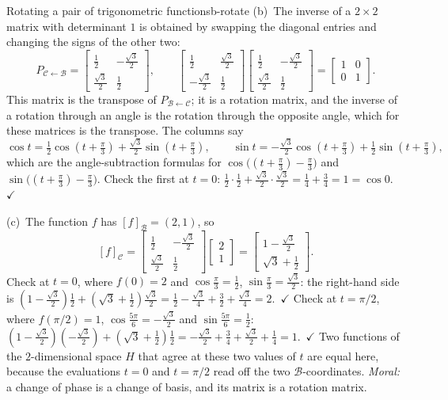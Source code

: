 \documentclass[11pt]{article}
\begin{document}
\begin{exmp}{Rotating a pair of trigonometric functions}{b-rotate}
(b)~The inverse of a $2\times2$ matrix with determinant $1$ is obtained by swapping the diagonal entries and changing the signs of the other two:
\[
P_{\mathcal{C}\leftarrow\mathcal{B}}=\begin{bmatrix}\tfrac12&-\tfrac{\sqrt3}{2}\\\tfrac{\sqrt3}{2}&\tfrac12\end{bmatrix},\qquad \begin{bmatrix}\tfrac12&\tfrac{\sqrt3}{2}\\-\tfrac{\sqrt3}{2}&\tfrac12\end{bmatrix}\begin{bmatrix}\tfrac12&-\tfrac{\sqrt3}{2}\\\tfrac{\sqrt3}{2}&\tfrac12\end{bmatrix}=\begin{bmatrix}1&0\\0&1\end{bmatrix}.
\]
This matrix is the transpose of $P_{\mathcal{B}\leftarrow\mathcal{C}}$; it is a rotation matrix, and the inverse of a rotation through an angle is the rotation through the opposite angle, which for these matrices is the transpose. The columns say
\[
\cos t=\tfrac12\cos(t+\tfrac\pi3)+\tfrac{\sqrt3}{2}\sin(t+\tfrac\pi3),\qquad \sin t=-\tfrac{\sqrt3}{2}\cos(t+\tfrac\pi3)+\tfrac12\sin(t+\tfrac\pi3),
\]
which are the angle-subtraction formulas for $\cos\bigl((t+\tfrac\pi3)-\tfrac\pi3\bigr)$ and $\sin\bigl((t+\tfrac\pi3)-\tfrac\pi3\bigr)$. Check the first at $t=0$: $\tfrac12\cdot\tfrac12+\tfrac{\sqrt3}{2}\cdot\tfrac{\sqrt3}{2}=\tfrac14+\tfrac34=1=\cos0$.\ $\checkmark$

(c)~The function $f$ has $[f]_{\mathcal{B}}=(2,1)$, so
\[
[f]_{\mathcal{C}}=\begin{bmatrix}\tfrac12&-\tfrac{\sqrt3}{2}\\\tfrac{\sqrt3}{2}&\tfrac12\end{bmatrix}\begin{bmatrix}2\\1\end{bmatrix}=\begin{bmatrix}1-\tfrac{\sqrt3}{2}\\\sqrt3+\tfrac12\end{bmatrix}.
\]
Check at $t=0$, where $f(0)=2$ and $\cos\tfrac\pi3=\tfrac12$, $\sin\tfrac\pi3=\tfrac{\sqrt3}{2}$: the right-hand side is $(1-\tfrac{\sqrt3}{2})\tfrac12+(\sqrt3+\tfrac12)\tfrac{\sqrt3}{2}=\tfrac12-\tfrac{\sqrt3}{4}+\tfrac32+\tfrac{\sqrt3}{4}=2$.\ $\checkmark$ Check at $t=\pi/2$, where $f(\pi/2)=1$, $\cos\tfrac{5\pi}{6}=-\tfrac{\sqrt3}{2}$ and $\sin\tfrac{5\pi}{6}=\tfrac12$: $(1-\tfrac{\sqrt3}{2})(-\tfrac{\sqrt3}{2})+(\sqrt3+\tfrac12)\tfrac12=-\tfrac{\sqrt3}{2}+\tfrac34+\tfrac{\sqrt3}{2}+\tfrac14=1$.\ $\checkmark$ Two functions of the $2$-dimensional space $H$ that agree at these two values of $t$ are equal here, because the evaluations $t=0$ and $t=\pi/2$ read off the two $\mathcal{B}$-coordinates. \emph{Moral:} a change of phase is a change of basis, and its matrix is a rotation matrix.
\end{exmp}
\end{document}

